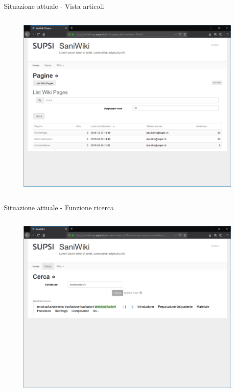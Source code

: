 \documentclass{beamer}
\begin{document}
\begin{frame}{Situazione attuale - Vista articoli}
\begin{columns}
		\begin{figure}[!h]
			\includegraphics[scale=0.2]{saniold_list.png}
		\end{figure}
\end{columns}
\end{frame}

\begin{frame}{Situazione attuale - Funzione ricerca}
\begin{columns}
	\begin{figure}[!h]
			\includegraphics[scale=0.2]{saniold_search.png}
		\end{figure}
\end{columns}
\end{frame}
\end{document}
